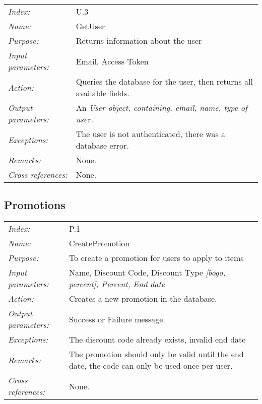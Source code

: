 \documentclass[10pt,letter]{article}
\begin{document}
\begin{tabularx}{\textwidth}{l X}
    \it{Index:} & U.3 \\
    \it{Name:} & GetUser \\
    \it{Purpose:} & Returns information about the user \\
    \it{Input parameters:} & Email, Access Token \\
    \it{Action:} & Queries the database for the user, then returns all available fields. \\
    \it{Output parameters:} &  An \it{User} object, containing, email, name, type of user.\\
    \it{Exceptions:} & The user is not authenticated, there was a database error. \\
    \it{Remarks:} & None. \\
    \it{Cross references:} & None. \\
    \hline
\end{tabularx}






\subsection{Promotions}

\begin{tabularx}{\textwidth}{l X}
    \it{Index:} & P.1 \\
    \it{Name:} & CreatePromotion \\
    \it{Purpose:} & To create a promotion for users to apply to items \\
    \it{Input parameters:} & Name, Discount Code, Discount Type \it{[bogo, percent]}, Percent, End date\\
    \it{Action:} & Creates a new promotion in the database.\\
    \it{Output parameters:} & Success or Failure message. \\
    \it{Exceptions:} & The discount code already exists, invalid end date \\
    \it{Remarks:} & The promotion should only be valid until the end date, the code can only be used once per user. \\
    \it{Cross references:} & None. \\
    \hline
\end{tabularx}
\end{document}
